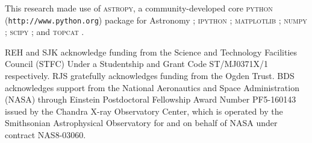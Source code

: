 \documentclass[usenatbib]{mn2e}
\begin{document}
This research made use of \textsc{astropy}, a community-developed core \textsc{python} ({\tt http://www.python.org}) package for Astronomy \citep{2013A&A...558A..33A}; \textsc{ipython} \citep{PER-GRA:2007}; \textsc{matplotlib} \citep{Hunter:2007}; \textsc{numpy} \citep{:/content/aip/journal/cise/13/2/10.1109/MCSE.2011.37}; \textsc{scipy} \citep{citescipy}; and \textsc{topcat} \citep{2005ASPC..347...29T}.

REH and SJK acknowledge funding from the Science and Technology Facilities Council (STFC) Under a Studentship and Grant Code ST/MJ0371X/1 respectively. RJS gratefully acknowledges funding from the Ogden Trust. BDS acknowledges support from the National Aeronautics and Space Administration (NASA) through Einstein Postdoctoral Fellowship Award Number PF5-160143 issued by the Chandra X-ray Observatory Center, which is operated by the Smithsonian Astrophysical Observatory for and on behalf of NASA under contract NAS8-03060.

{}

\end{document}
